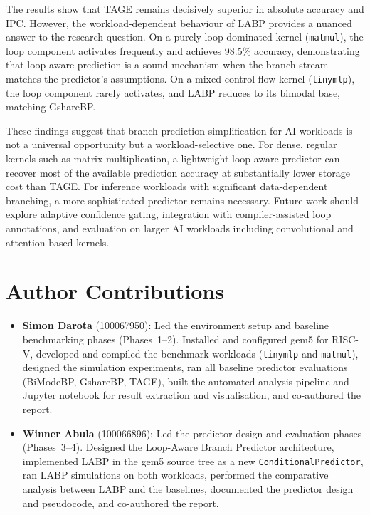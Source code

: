 \documentclass[conference]{IEEEtran}
\begin{document}
The results show that TAGE remains decisively superior in absolute accuracy and IPC. However, the workload-dependent behaviour of LABP provides a nuanced answer to the research question. On a purely loop-dominated kernel (\texttt{matmul}), the loop component activates frequently and achieves 98.5\% accuracy, demonstrating that loop-aware prediction is a sound mechanism when the branch stream matches the predictor's assumptions. On a mixed-control-flow kernel (\texttt{tinymlp}), the loop component rarely activates, and LABP reduces to its bimodal base, matching GshareBP.

These findings suggest that branch prediction simplification for AI workloads is not a universal opportunity but a workload-selective one. For dense, regular kernels such as matrix multiplication, a lightweight loop-aware predictor can recover most of the available prediction accuracy at substantially lower storage cost than TAGE. For inference workloads with significant data-dependent branching, a more sophisticated predictor remains necessary. Future work should explore adaptive confidence gating, integration with compiler-assisted loop annotations, and evaluation on larger AI workloads including convolutional and attention-based kernels.

\section*{Author Contributions}

\begin{itemize}
    \item \textbf{Simon Darota} (100067950): Led the environment setup and baseline benchmarking phases (Phases~1--2). Installed and configured gem5 for RISC-V, developed and compiled the benchmark workloads (\texttt{tinymlp} and \texttt{matmul}), designed the simulation experiments, ran all baseline predictor evaluations (BiModeBP, GshareBP, TAGE), built the automated analysis pipeline and Jupyter notebook for result extraction and visualisation, and co-authored the report.
    \item \textbf{Winner Abula} (100066896): Led the predictor design and evaluation phases (Phases~3--4). Designed the Loop-Aware Branch Predictor architecture, implemented LABP in the gem5 source tree as a new \texttt{ConditionalPredictor}, ran LABP simulations on both workloads, performed the comparative analysis between LABP and the baselines, documented the predictor design and pseudocode, and co-authored the report.
\end{itemize}
\end{document}

